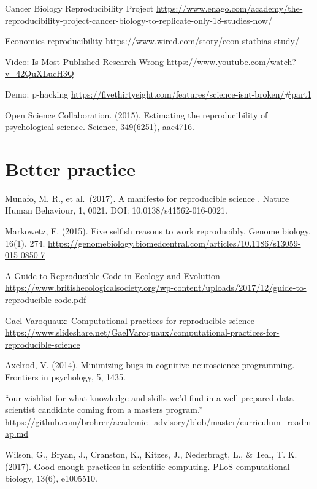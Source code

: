 \documentclass[
]{book}
\begin{document}
Cancer Biology Reproducibility Project
\url{https://www.enago.com/academy/the-reproducibility-project-cancer-biology-to-replicate-only-18-studies-now/}

Economics reproducibility
\url{https://www.wired.com/story/econ-statbias-study/}

Video: Is Most Published Research Wrong \url{https://www.youtube.com/watch?v=42QuXLucH3Q}

Demo: p-hacking \url{https://fivethirtyeight.com/features/science-isnt-broken/\#part1}

Open Science Collaboration. (2015). Estimating the reproducibility of psychological science. Science, 349(6251), aac4716.

\hypertarget{better-practice}{%
\section{Better practice}\label{better-practice}}

Munafo, M. R., et al.~(2017). A manifesto for reproducible science . Nature Human Behaviour, 1, 0021. DOI: 10.0138/s41562-016-0021.

Markowetz, F. (2015). Five selfish reasons to work reproducibly. Genome biology, 16(1), 274. \url{https://genomebiology.biomedcentral.com/articles/10.1186/s13059-015-0850-7}

A Guide to Reproducible Code in Ecology and Evolution \url{https://www.britishecologicalsociety.org/wp-content/uploads/2017/12/guide-to-reproducible-code.pdf}

Gael Varoquaux: Computational practices for reproducible science \url{https://www.slideshare.net/GaelVaroquaux/computational-practices-for-reproducible-science}

Axelrod, V. (2014). \href{https://www.frontiersin.org/articles/10.3389/fpsyg.2014.01435/full}{Minimizing bugs in cognitive neuroscience programming}. Frontiers in psychology, 5, 1435.

``our wishlist for what knowledge and skills we'd find in a well-prepared data scientist candidate coming from a masters program.'' \url{https://github.com/brohrer/academic_advisory/blob/master/curriculum_roadmap.md}

Wilson, G., Bryan, J., Cranston, K., Kitzes, J., Nederbragt, L., \& Teal, T. K. (2017). \href{https://journals.plos.org/ploscompbiol/article?id=10.1371/journal.pcbi.1005510}{Good enough practices in scientific computing}. PLoS computational biology, 13(6), e1005510.
\end{document}
